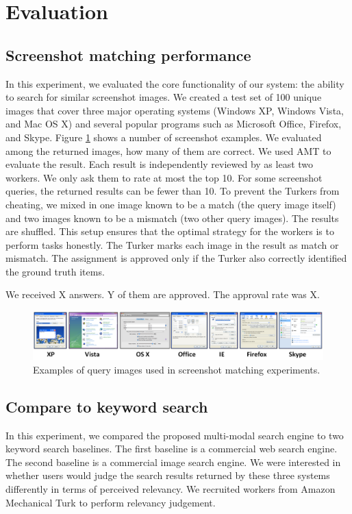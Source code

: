 \documentclass{www2010-submission}
\begin{document}
\section{Evaluation}

\subsection{Screenshot matching performance}

In this experiment, we evaluated the core functionality of our system:
the ability to search for similar screenshot images.  We created a
test set of 100 unique images that cover three major operating systems
(Windows XP, Windows Vista, and Mac OS X) and several popular programs
such as Microsoft Office, Firefox, and Skype. Figure
\ref{fig:query_examples} shows a number of screenshot examples.  We
evaluated among the returned images, how many of them are correct. We
used AMT to evaluate the result. Each result is independently reviewed
by as least two workers. We only ask them to rate at most the top 10. For
some screenshot queries, the returned results can be fewer than 10. To
prevent the Turkers from cheating, we mixed in one image known to be a
match (the query image itself) and two images known to be a mismatch
(two other query images). The results are shuffled. This setup ensures
that the optimal strategy for the workers is to perform tasks
honestly. The Turker marks each image in the result as match or
mismatch. The assignment is approved only if the Turker also correctly
identified the ground truth items.

We received X answers. Y of them are approved. The approval rate
was X.

\begin{figure}
\includegraphics[width=2\columnwidth]{figure/query_examples.png}
\caption{Examples of query images used in screenshot matching
experiments.}
\label{fig:query_examples}
\end{figure}


\subsection{Compare to keyword search}

In this experiment, we compared the proposed multi-modal search engine
to two keyword search baselines. The first baseline is a commercial
web search engine.  The second baseline is a commercial image search
engine. We were interested in whether users would judge the search
results returned by these three systems differently in terms of
perceived relevancy. We recruited workers from Amazon Mechanical Turk
to perform relevancy judgement.
\end{document}
